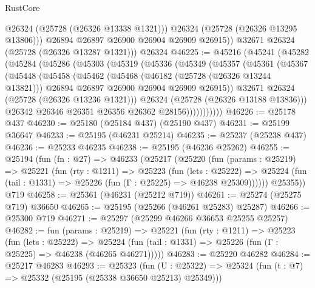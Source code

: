 \begin{lexlean}{RustCore}
\begin{coremodule}
              @26324
              (@25728 (@26326 @13338 @1321)))
            @26324
            (@25728 (@26326 @13295 @13806)))
          @26894
          @26897
          @26900
          @26904
          @26909
          @26915))
      @32671
      @26324
      (@25728 (@26326 @13287 @1321)))
    @26324
@46225 := @45216
    (@45241
      (@45282
        (@45284
          (@45286
            (@45303
              (@45319
                (@45336
                  (@45349
                    (@45357
                      (@45361
                        (@45367
                          (@45448
                            (@45458
                              (@45462
                                (@45468
                                  (@46182 (@25728 (@26326 @13244 @13821)))
                                  @26894
                                  @26897
                                  @26900
                                  @26904
                                  @26909
                                  @26915))
                              @32671
                              @26324
                              (@25728 (@26326 @13236 @1321)))
                            @26324
                            (@25728 (@26326 @13188 @13836)))
                          @26342
                          @26346
                          @26351
                          @26356
                          @26362
                          @28156)))))))))))
@46226 := @25178 @437
@46230 := @25180 (@25184 @437) (@25190 @437)
@46231 := @25199 @36647
@46233 := @25195 (@46231 @25214)
@46235 := @25237 (@25238 @437)
@46236 := @25233 @46235
@46238 := @25195 (@46236 @25262)
@46255 := @25194
    (fun (fn : @27) =>
    @46233
      (@25217
        (@25220
          (fun (params : @25219) =>
          @25221
            (fun (rty : @1211) =>
            @25223
              (fun (lets : @25222) =>
              @25224 (fun (tail : @1331) => @25226 (fun (Γ : @25225) => @46238 @25309))))))
        @25355))
    @719
@46258 := @25361 (@46231 (@25212 @719))
@46261 := @25274 (@25275 @719) @36650
@46265 := @25195 (@25266 (@46261 @25283) @25287)
@46266 := @25300 @719
@46271 := @25297 (@25299 @46266 @36653 @25255 @25257)
@46282 := fun (params : @25219) =>
  @25221
    (fun (rty : @1211) =>
    @25223
      (fun (lets : @25222) =>
      @25224 (fun (tail : @1331) => @25226 (fun (Γ : @25225) => @46238 (@46265 @46271)))))
@46283 := @25220 @46282
@46284 := @25217 @46283
@46293 := @25323
    (fun (U : @25322) => @25324 (fun (t : @7) => @25332 (@25195 (@25338 @36650 @25213) @25349)))

\end{coremodule}
\end{lexlean}
